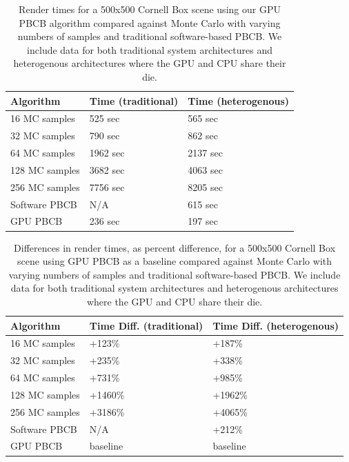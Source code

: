 \begin{table}[h!]
   \centering
   \begin{tabular}{ | l | l | l | }
   \hline
   \textbf{Algorithm} & \textbf{Time (traditional)} & \textbf{Time (heterogenous)} \\ \hline
   16 MC samples & 525 sec & 565 sec \\ \hline
   32 MC samples & 790 sec & 862 sec \\ \hline
   64 MC samples & 1962 sec & 2137 sec \\ \hline
   128 MC samples & 3682 sec & 4063 sec \\ \hline
   256 MC samples & 7756 sec & 8205 sec \\ \hline
   Software PBCB & N/A & 615 sec \\ \hline
   GPU PBCB & 236 sec & 197 sec \\ \hline
   \end{tabular}
   \captionfonts
   \caption[Render times]{Render times for a 500x500 Cornell Box scene using our GPU PBCB algorithm compared against Monte Carlo with varying numbers of samples and traditional software-based PBCB. We include data for both traditional system architectures and heterogenous architectures where the GPU and CPU share their die.}
   \label{tbl:renders}
\end{table}

\begin{table}[h!]
   \centering
   \begin{tabular}{ | l | l | l | }
   \hline
   \textbf{Algorithm} & \textbf{Time Diff. (traditional)} & \textbf{Time Diff. (heterogenous)} \\ \hline
   16 MC samples & +123\% & +187\% \\ \hline
   32 MC samples & +235\% & +338\% \\ \hline
   64 MC samples & +731\% & +985\% \\ \hline
   128 MC samples & +1460\% & +1962\% \\ \hline
   256 MC samples & +3186\% & +4065\% \\ \hline
   Software PBCB & N/A & +212\% \\ \hline
   GPU PBCB & baseline & baseline \\ \hline
   \end{tabular}
   \captionfonts
   \caption[Render times speedup]{Differences in render times, as percent difference, for a 500x500 Cornell Box scene using GPU PBCB as a baseline compared against Monte Carlo with varying numbers of samples and traditional software-based PBCB. We include data for both traditional system architectures and heterogenous architectures where the GPU and CPU share their die.}
   \label{tbl:render_diffs}
\end{table}

